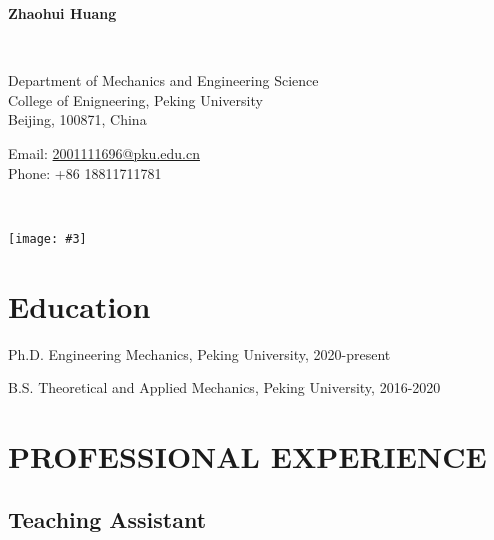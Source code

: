 \documentclass[12pt,letterpaper]{report}
\newcommand{\headingphoto}[3]{
	\begin{minipage}[t]{0.60\textwidth}
		\begin{dummyenv}
			\vspace*{\fill}
			\Huge \textcolor{color-title}{#1}
		\end{dummyenv}
		\vspace{5mm}\\
		#2
	\end{minipage}
	\begin{minipage}[t]{0.35\textwidth}
		\begin{flushright}
			\texttt{[image: \#3]}
		\end{flushright}
	\end{minipage}
}
\newcommand{\myname}{Zhaohui Huang}
\newcommand{\namefont}[1]{{\normalfont\bfseries\Huge{#1}}}
\begin{document}
    \raggedright{}

    \namefont{\myname}
    

    \vspace{1em}
    \begin{minipage}[t]{0.700\textwidth}
        \
        \newline
        \
        \newline
        

        Department of Mechanics and Engineering Science \\
        College of Enigneering, Peking University \\
        Beijing, 100871, China
        \
        \newline
        
        Email: \href{mailto:2001111696@pku.edu.cn}{2001111696@pku.edu.cn} \\
        Phone: +86 18811711781
        
    \end{minipage}
    \begin{minipage}[t]{0.295\textwidth}
        \headingphoto{}{
        }{photo1.jpg}
        \flushright{}
    \end{minipage}


    \section*{Education}

    \begin{tablist}

        \item[Ph.D.] \tab{}Engineering Mechanics, Peking University, 2020-present
        \item[B.S.]  \tab{}Theoretical and Applied Mechanics, Peking University, 2016-2020

    \end{tablist}

	\section*{PROFESSIONAL EXPERIENCE}

	\subsection*{Teaching Assistant}
\end{document}
